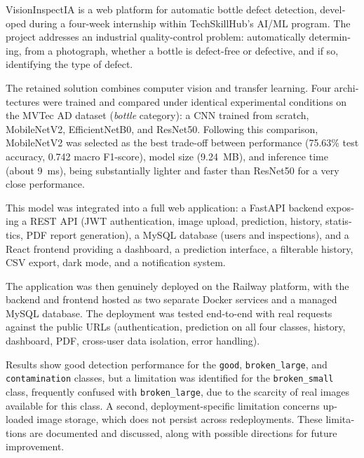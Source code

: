 \documentclass[11pt,a4paper]{report}
\begin{document}
\begin{otherlanguage}{english}

VisionInspectIA is a web platform for automatic bottle defect detection, developed during a four-week internship within TechSkillHub's AI/ML program. The project addresses an industrial quality-control problem: automatically determining, from a photograph, whether a bottle is defect-free or defective, and if so, identifying the type of defect.

The retained solution combines computer vision and transfer learning. Four architectures were trained and compared under identical experimental conditions on the MVTec AD dataset (\emph{bottle} category): a CNN trained from scratch, MobileNetV2, EfficientNetB0, and ResNet50. Following this comparison, MobileNetV2 was selected as the best trade-off between performance (75.63\% test accuracy, 0.742 macro F1-score), model size (9.24~MB), and inference time (about 9~ms), being substantially lighter and faster than ResNet50 for a very close performance.

This model was integrated into a full web application: a FastAPI backend exposing a REST API (JWT authentication, image upload, prediction, history, statistics, PDF report generation), a MySQL database (users and inspections), and a React frontend providing a dashboard, a prediction interface, a filterable history, CSV export, dark mode, and a notification system.

The application was then genuinely deployed on the Railway platform, with the backend and frontend hosted as two separate Docker services and a managed MySQL database. The deployment was tested end-to-end with real requests against the public URLs (authentication, prediction on all four classes, history, dashboard, PDF, cross-user data isolation, error handling).

Results show good detection performance for the \texttt{good}, \texttt{broken\_large}, and \texttt{contamination} classes, but a limitation was identified for the \texttt{broken\_small} class, frequently confused with \texttt{broken\_large}, due to the scarcity of real images available for this class. A second, deployment-specific limitation concerns uploaded image storage, which does not persist across redeployments. These limitations are documented and discussed, along with possible directions for future improvement.

\end{otherlanguage}

\tableofcontents
\listoffigures
\listoftables
\end{document}
